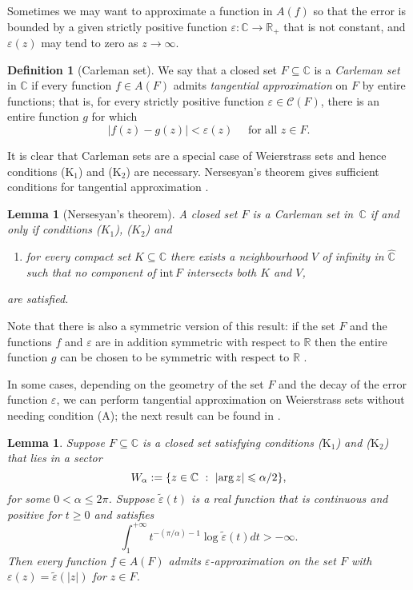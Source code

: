 \documentclass[a4paper, 12pt, reqno]{amsart}
\numberwithin{equation}{section}
\theoremstyle{plain}
\newtheorem{lem}[thm]{Lemma}
\theoremstyle{definition}
\newtheorem{dfn}[thm]{Definition}
\theoremstyle{remark}
\newcommand{\C}{{\mathbb{C}}}
\newcommand{\CR}{{\hat{\mathbb{C}}}}
\newcommand{\R}{{\mathbb{R}}}
\begin{document}
Sometimes we may want to approximate a function in $A(f)$ so that the error is bounded by a given strictly positive function $\varepsilon:\C\to\R_+$ that is not constant, and $\varepsilon(z)$ may tend to zero as $z\to\infty$. 

\begin{dfn}[Carleman set]
\label{dfn:carleman-set}
We say that a closed set $F\subseteq \C$ is a \textit{Carleman set} in $\C$ if every function $f\in A(F)$ admits \textit{tangential approximation} on $F$ by entire functions; that is, for every strictly positive function $\varepsilon\in\mathcal C(F)$, there is an entire function $g$ for which
$$
|f(z)-g(z)|<\varepsilon(z)\quad \mbox{ for all } z\in F.
$$
\end{dfn}

It is clear that Carleman sets are a special case of Weierstrass sets and hence conditions ($\text{K}_1$) and ($\text{K}_2$) are necessary. Nersesyan's theorem gives sufficient conditions for tangential approximation \cite{nersesjan71}.

\begin{lem}[Nersesyan's theorem]
A closed set $F$ is a Carleman set in~$\C$ if and only if conditions \emph{($K_1$)}, \emph{($K_2$)} and 
\begin{enumerate}
\item[\emph{(A)}] for every compact set $K\subseteq \C$ there exists a neighbourhood $V$ of infinity in $\CR$ such that no component of $\mbox{int}\, F$ intersects both $K$ and $V$,
\end{enumerate}
are satisfied.
\label{lem:nersesjan}
\end{lem}

Note that there is also a symmetric version of this result: if the set $F$ and the functions $f$ and $\varepsilon$ are in addition symmetric with respect to $\R$ then the entire function $g$ can be chosen to be symmetric with respect to $\R$ \cite[Section 2]{gauthier13}.

In some cases, depending on the geometry of the set $F$ and the decay of the error function $\varepsilon$, we can perform tangential approximation on Weierstrass sets without needing condition (A); the next result can be found in \cite[Corollary in p.162]{gaier87}.

\begin{lem}
Suppose $F\subseteq \C$ is a closed set satisfying conditions ($\text{K}_1$) and ($\text{K}_2$) that lies in a sector
$$
W_\alpha:=\{z\in \C\ :\ |\textup{arg}\,z|\leqslant \alpha/2\},
$$
for some $0<\alpha\leqslant 2\pi$. Suppose $\tilde{\varepsilon}(t)$ is a real function that is continuous and positive for $t\geqslant 0$ and satisfies
$$
\int_1^{+\infty} t^{-(\pi/\alpha)-1}\log\tilde{\varepsilon}(t)dt>-\infty.
$$
Then every function $f\in A(F)$ admits $\varepsilon$-approximation on the set $F$ with $\varepsilon(z)=\tilde{\varepsilon}(|z|)$ for $z\in F$. 
\label{lem:approx-sectors}
\end{lem}
\end{document}
